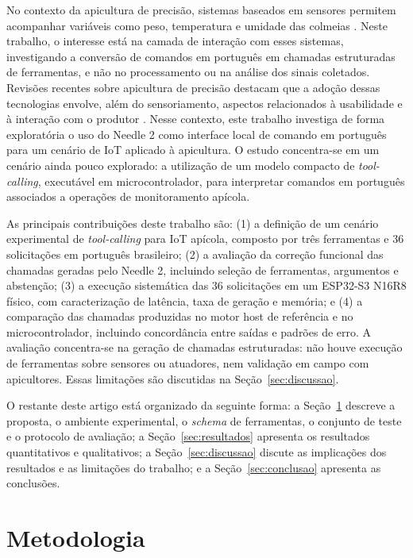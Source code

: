\documentclass[12pt]{article}
\begin{document}
No contexto da apicultura de precisão, sistemas baseados em sensores
permitem acompanhar variáveis como peso, temperatura e umidade das
colmeias \cite{henry2019precision,meikle2015application,danieli2024precision}.
Neste trabalho, o interesse está na camada de interação com esses sistemas, investigando a conversão de comandos em português em chamadas estruturadas de ferramentas, e não no processamento ou na análise dos sinais coletados. Revisões recentes sobre apicultura de precisão destacam que a adoção dessas tecnologias envolve, além do sensoriamento, aspectos relacionados à usabilidade e à interação com o produtor \cite{danieli2024precision}. Nesse contexto, este trabalho investiga de forma exploratória o uso do Needle 2 como interface local de comando em português para um cenário de IoT aplicado à apicultura. O estudo concentra-se em um cenário ainda pouco explorado: a utilização de um modelo compacto de \textit{tool-calling}, executável em microcontrolador, para interpretar comandos em português associados a operações de monitoramento apícola.

As principais contribuições deste trabalho são:
(1) a definição de um cenário experimental de \textit{tool-calling}
para IoT apícola, composto por três ferramentas e 36 solicitações
em português brasileiro; (2) a avaliação da correção funcional das
chamadas geradas pelo Needle 2, incluindo seleção de ferramentas,
argumentos e abstenção; (3) a execução sistemática das 36 solicitações
em um ESP32-S3 N16R8 físico, com caracterização de latência, taxa de
geração e memória; e (4) a comparação das chamadas produzidas no
motor host de referência e no microcontrolador, incluindo concordância
entre saídas e padrões de erro. A avaliação concentra-se na geração
de chamadas estruturadas: não houve execução de ferramentas sobre
sensores ou atuadores, nem validação em campo com apicultores.
Essas limitações são discutidas na Seção~\ref{sec:discussao}.

O restante deste artigo está organizado da seguinte forma:
a Seção~\ref{sec:metodologia} descreve a proposta, o ambiente experimental, o \textit{schema} de ferramentas, o conjunto de teste e o protocolo de avaliação; a Seção~\ref{sec:resultados} apresenta os resultados quantitativos e qualitativos; a Seção~\ref{sec:discussao} discute as implicações dos resultados e as limitações do trabalho; e a
Seção~\ref{sec:conclusao} apresenta as conclusões.

\section{Metodologia}
\label{sec:metodologia}
\end{document}
